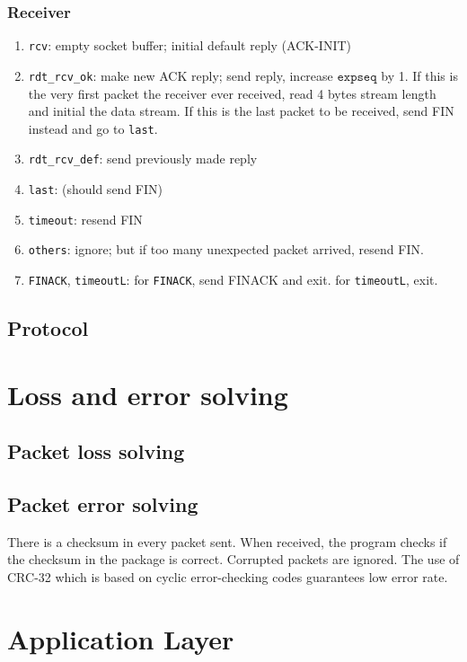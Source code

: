 \documentclass[10pt,a4paper]{article}
\begin{document}
    \subsubsection{Receiver}
    \begin{enumerate}
        \item \texttt{rcv}: empty socket buffer; initial default reply (ACK-INIT)
        \item \texttt{rdt\_rcv\_ok}: make new ACK reply; send reply, increase $\texttt{expseq}$ by 1. If this is the very first packet the receiver ever received, read 4 bytes stream length and initial the data stream. If this is the last packet to be received, send FIN instead and go to \texttt{last}.
        \item \texttt{rdt\_rcv\_def}: send previously made reply
        \item \texttt{last}: (should send FIN)
        \item \texttt{timeout}: resend FIN
        \item \texttt{others}: ignore; but if too many unexpected packet arrived, resend FIN.
        \item \texttt{FINACK}, \texttt{timeoutL}: for \texttt{FINACK}, send FINACK and exit. for \texttt{timeoutL}, exit.
    \end{enumerate}
\subsection{Protocol}
\section{Loss and error solving}
    \subsection{Packet loss solving}
        
    \subsection{Packet error solving}
        There is a checksum in every packet sent. When received, the program checks if the checksum in the package is correct. Corrupted packets are ignored. The use of CRC-32 which is based on cyclic error-checking codes guarantees low error rate.

\section{Application Layer}
    
\end{document}
